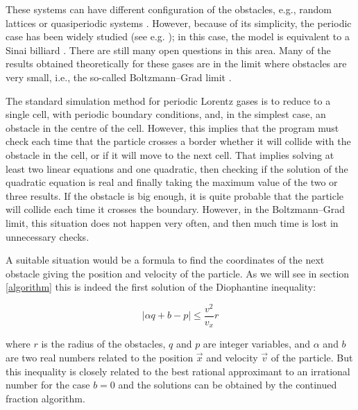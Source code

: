 \documentclass[pre,amsmath,amssymb, twocolumn, showpacs]{revtex4-1}
\begin{document}
These systems can have different configuration of the obstacles, e.g., random lattices \cite{latz1997lyapunov,dellago1997lyapunov, van1998chaotic} or quasiperiodic systems \cite{kraemer2013embedding,wennberg2012free}. However, because of its simplicity, the periodic case has been widely studied (see e.g. \cite{bunimovich1981statistical,bleher1992statistical, chernov1994statistical, gilbert2011diffusive}); in this case, the model is equivalent to a Sinai billiard  \cite{bunimovich1981statistical}. There are still many open questions in this area\cite{gilbert2009persistence,marklof2011periodic,nandori2012tail, dettmann2012new}. Many of the results obtained theoretically for these gases are in the limit where obstacles are very small, i.e., the so-called Boltzmann--Grad limit \cite{caglioti2003distribution, golse2012recent,boca2007distribution,golse2006periodic,caglioti2008boltzmann,caglioti2010boltzmann, golse2000distribution,marklof2008kinetic, bourgain1998distribution}. 

The standard simulation method for periodic Lorentz gases is to reduce to a single cell, with periodic boundary conditions, and, in the simplest case, an obstacle in the centre of the cell\cite{sanders2005fine, sanders2008normal}. However, this implies that the program must check each time that the particle crosses a border whether it will collide with the obstacle in the cell, or if it will move to the next cell. That implies solving at least two linear equations and one quadratic, then checking if the solution of the quadratic equation is real and finally taking the maximum value of the two or three results. If the obstacle is big enough, it is quite probable that the particle will collide each time it crosses the boundary. However, in the Boltzmann--Grad limit, this situation does not happen very often, and then much time is lost in unnecessary checks.

A suitable situation would be a formula to find the coordinates of the next obstacle giving the position and velocity of the particle. As we will see in section \ref{algorithm} this is indeed the first solution of the Diophantine inequality:

\begin{equation}
|\alpha q+b-p|\leq  \frac{v^2}{v_x} r
\end{equation}

where $r$ is the radius of the obstacles, $q$ and $p$ are integer variables, and $\alpha$ and $b$ are two real numbers related to the position $\vec{x}$ and velocity $\vec{v}$ of the particle. But this inequality is closely related to the best rational approximant to an irrational number for the case $b=0$ and the solutions can be obtained by the continued fraction algorithm. 
\end{document}
